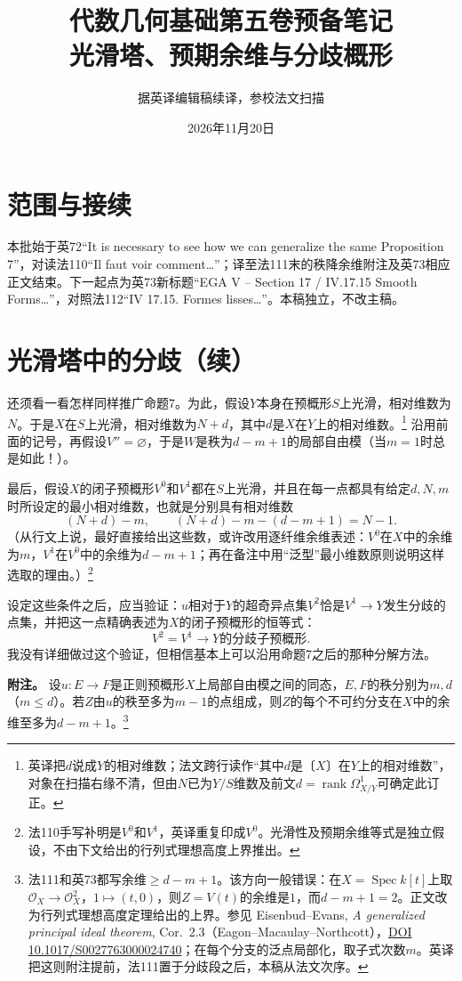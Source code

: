 \documentclass[openany,fontset=fandol]{ctexbook}
\providecommand{\OO}{\mathcal O}
\begin{document}
\title{代数几何基础第五卷预备笔记\\光滑塔、预期余维与分歧概形}
\author{据英译编辑稿续译，参校法文扫描}
\date{2026年11月20日}
\maketitle
\chapter*{范围与接续}
本批始于英72“It is necessary to see how we can generalize the same Proposition 7”，对读法110“Il faut voir comment…”；译至法111末的秩降余维附注及英73相应正文结束。下一起点为英73新标题“EGA V -- Section 17 / IV.17.15 Smooth Forms…”，对照法112“IV 17.15. Formes lisses…”。本稿独立，不改主稿。
\chapter*{光滑塔中的分歧（续）}
\enlargethispage{4\baselineskip}
还须看一看怎样同样推广命题7。为此，假设$Y$本身在预概形$S$上光滑，相对维数为$N$。于是$X$在$S$上光滑，相对维数为$N+d$，其中$d$是$X$在$Y$上的相对维数。\footnote{英译把$d$说成$Y$的相对维数；法文跨行读作“其中$d$是〔$X$〕在$Y$上的相对维数”，对象在扫描右缘不清，但由$N$已为$Y/S$维数及前文$d=\operatorname{rank}\Omega^1_{X/Y}$可确定此订正。}
沿用前面的记号，再假设$V''=\varnothing$，于是$W$是秩为$d-m+1$的局部自由模（当$m=1$时总是如此！）。

最后，假设$X$的闭子预概形$V^0$和$V^1$都在$S$上光滑，并且在每一点都具有给定$d,N,m$时所设定的最小相对维数，也就是分别具有相对维数
\[
(N+d)-m,\qquad (N+d)-m-(d-m+1)=N-1.
\]
（从行文上说，最好直接给出这些数，或许改用逐纤维余维表述：$V^0$在$X$中的余维为$m$，$V^1$在$V^0$中的余维为$d-m+1$；再在备注中用“泛型”最小维数原则说明这样选取的理由。）\footnote{法110手写补明是$V^0$和$V^1$，英译重复印成$V^0$。光滑性及预期余维等式是独立假设，不由下文给出的行列式理想高度上界推出。}

设定这些条件之后，应当验证：$u$相对于$Y$的超奇异点集$V^2$恰是$V^1\to Y$发生分歧的点集，并把这一点精确表述为$X$的闭子预概形的恒等式：
\[
V^2=\text{$V^1\to Y$的分歧子预概形}.
\]
我没有详细做过这个验证，但相信基本上可以沿用命题7之后的那种分解方法。

\medskip
\noindent\textbf{附注。}
设$u:E\to F$是正则预概形$X$上局部自由模之间的同态，$E,F$的秩分别为$m,d$（$m\le d$）。若$Z$由$u$的秩至多为$m-1$的点组成，则$Z$的每个不可约分支在$X$中的余维至多为$d-m+1$。\footnote{法111和英73都写余维$\ge d-m+1$。该方向一般错误：在$X=\operatorname{Spec}k[t]$上取$\OO_X\to\OO_X^2$，$1\mapsto(t,0)$，则$Z=V(t)$的余维是$1$，而$d-m+1=2$。正文改为行列式理想高度定理给出的上界。参见 Eisenbud--Evans, \emph{A generalized principal ideal theorem}, Cor.~2.3（Eagon--Macaulay--Northcott），\href{https://doi.org/10.1017/S0027763000024740}{DOI 10.1017/S0027763000024740}；在每个分支的泛点局部化，取子式次数$m$。英译把这则附注提前，法111置于分歧段之后，本稿从法文次序。}
\end{document}
